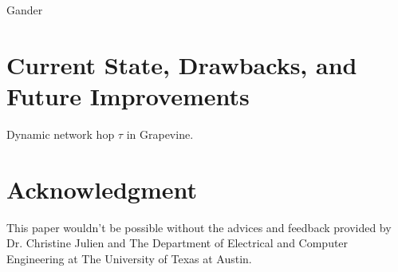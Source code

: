 \documentclass[11pt,onecolumn]{article}
\begin{document}
Gander \cite{michel2012mygander}


	
\section{Current State, Drawbacks, and Future Improvements}

Dynamic network hop $\tau$ in Grapevine.


\section*{Acknowledgment}
This paper wouldn't be possible without the advices and feedback provided by Dr. Christine Julien and The Department of Electrical and Computer Engineering at The University of Texas at Austin.



\end{document}
